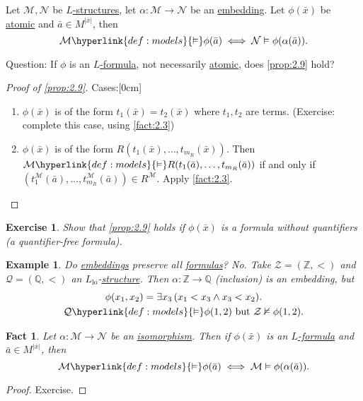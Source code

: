 \documentclass{article}
\let\models\vDash
\let\nModels\nvDash
\newtheorem{nexample}[nthm]{Example}
\newtheorem{nexercise}[nthm]{Exercise}
\newtheorem{nfact}[nthm]{Fact}
\begin{document}
\begin{nprop}\label{prop:2.9}
  Let $\mathcal{M}, \mathcal{N}$ be \hyperlink{def:str}{$L$-structures}, let $\alpha: \mathcal{M} \to \mathcal{N}$ be an \hyperlink{def:embedding}{embedding}.
  Let $\phi(\bar{x})$ be \hyperlink{def:atomform}{atomic} and $\bar{a} \in M^{|\bar{x}|}$, then
  \begin{equation*}
    \mathcal{M} \hyperlink{def:models}{\models} \phi(\bar{a}) \iff \mathcal{N} \models \phi(\alpha(\bar{a})).
  \end{equation*}
\end{nprop}

Question: If $\phi$ is an \hyperlink{def:form}{$L$-formula}, not necessarily \hyperlink{def:atomform}{atomic}, does \cref{prop:2.9} hold?

\begin{proof}[Proof of \cref{prop:2.9}]
  Cases:[0cm]
  \begin{enumerate}[label=(\roman*)]
    \item $\phi(\bar{x})$ is of the form $t_1(\bar{x}) = t_2(\bar{x})$ where $t_1,t_2$ are terms.
      (Exercise: complete this case, using \cref{fact:2.3})
    \item $\phi(\bar{x})$ is of the form $R(t_1(\bar{x}), \dotsc, t_{m_R}(\bar{x}))$.
      Then $\mathcal{M} \hyperlink{def:models}{\models} R(t_1(\bar{a}), \dotsc, t_{m_R}(\bar{a}))$ if and only if $(t_1^\mathcal{M}(\bar{a}), \dots, t_{m_R}^\mathcal{M}(\bar{a})) \in R^\mathcal{M}$. Apply \cref{fact:2.3}.
  \end{enumerate}
\end{proof}
\begin{nexercise}\label{ex:2.10}
  Show that \cref{prop:2.9} holds if $\phi(\bar{x})$ is a formula without quantifiers (a quantifier-free formula).
\end{nexercise}
\begin{nexample}\label{ex:2.11}
  Do \hyperlink{def:embedding}{embeddings} preserve \emph{all} \hyperlink{def:form}{formulas}? No.
  Take $\mathcal{Z} = (\mathbb{Z}, <)$ and $\mathcal{Q} = (\mathbb{Q}, <)$ an \hyperlink{def:lgp}{$L_{\text{lo}}$}-\hyperlink{def:str}{structure}.
  Then $\alpha: \mathbb{Z} \to \mathbb{Q}$ (inclusion) is an embedding, but
  \begin{gather*}
    \phi(x_1, x_2) = \exists x_3\,(x_1 < x_3 \wedge x_3 < x_2). \\
    \mathcal{Q} \hyperlink{def:models}{\models} \phi(1,2) \text{ but } \mathcal{Z} \nModels \phi(1,2).
  \end{gather*}
\end{nexample}
\begin{nfact}\label{fact:2.12}
  Let $\alpha: \mathcal{M} \to \mathcal{N}$ be an \hyperlink{def:iso}{isomorphism}.
  Then if $\phi(\bar{x})$ is an \hyperlink{def:form}{$L$-formula} and $\bar{a} \in M^{|\bar{x}|}$, then
  \begin{equation*}
    \mathcal{M} \hyperlink{def:models}{\models} \phi(\bar{a}) \iff \mathcal{M} \models \phi(\alpha(\bar{a})).
  \end{equation*}
\end{nfact}
\begin{proof}
  Exercise.
\end{proof}
\end{document}
